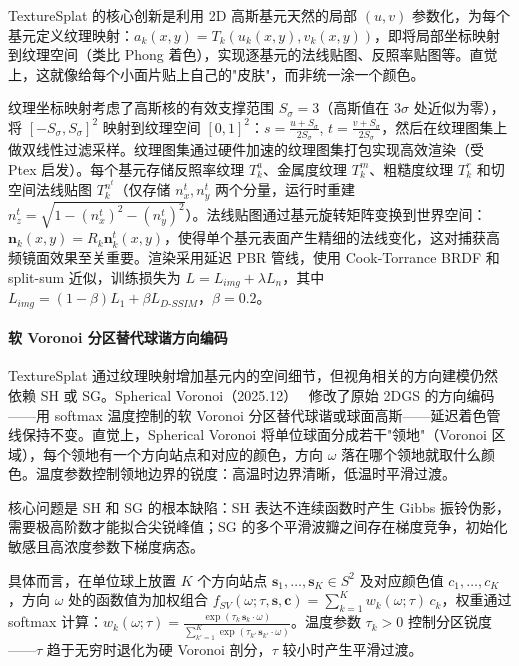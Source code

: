 TextureSplat 的核心创新是利用 2D 高斯基元天然的局部 $(u,v)$ 参数化，为每个基元定义纹理映射：$a_k(x,y) = T_k(u_k(x,y), v_k(x,y))$，即将局部坐标映射到纹理空间（类比 Phong 着色），实现逐基元的法线贴图、反照率贴图等。直觉上，这就像给每个小面片贴上自己的"皮肤"，而非统一涂一个颜色。

纹理坐标映射考虑了高斯核的有效支撑范围 $S_\sigma = 3$（高斯值在 $3\sigma$ 处近似为零），将 $[-S_\sigma, S_\sigma]^2$ 映射到纹理空间 $[0,1]^2$：$s = \frac{u + S_\sigma}{2S_\sigma}$, $t = \frac{v + S_\sigma}{2S_\sigma}$，然后在纹理图集上做双线性过滤采样。纹理图集通过硬件加速的纹理图集打包实现高效渲染（受 Ptex 启发）。每个基元存储反照率纹理 $T_k^a$、金属度纹理 $T_k^m$、粗糙度纹理 $T_k^r$ 和切空间法线贴图 $T_k^{n^t}$（仅存储 $n_x^t, n_y^t$ 两个分量，运行时重建 $n_z^t = \sqrt{1 - (n_x^t)^2 - (n_y^t)^2}$）。法线贴图通过基元旋转矩阵变换到世界空间：$\mathbf{n}_k(x,y) = R_k \mathbf{n}^t_k(x,y)$，使得单个基元表面产生精细的法线变化，这对捕获高频镜面效果至关重要。渲染采用延迟 PBR 管线，使用 Cook-Torrance BRDF 和 split-sum 近似，训练损失为 $L = L_{img} + \lambda L_n$，其中 $L_{img} = (1-\beta) L_1 + \beta L_{D\text{-}SSIM}$，$\beta = 0.2$。

\paragraph{软 Voronoi 分区替代球谐方向编码}

TextureSplat 通过纹理映射增加基元内的空间细节，但视角相关的方向建模仍然依赖 SH 或 SG。Spherical Voronoi（2025.12）~\cite{2512_14180} 修改了原始 2DGS 的方向编码——用 softmax 温度控制的软 Voronoi 分区替代球谐或球面高斯——延迟着色管线保持不变。直觉上，Spherical Voronoi 将单位球面分成若干"领地"（Voronoi 区域），每个领地有一个方向站点和对应的颜色，方向 $\omega$ 落在哪个领地就取什么颜色。温度参数控制领地边界的锐度：高温时边界清晰，低温时平滑过渡。

核心问题是 SH 和 SG 的根本缺陷：SH 表达不连续函数时产生 Gibbs 振铃伪影，需要极高阶数才能拟合尖锐峰值；SG 的多个平滑波瓣之间存在梯度竞争，初始化敏感且高浓度参数下梯度病态。

具体而言，在单位球上放置 $K$ 个方向站点 $\mathbf{s}_1, \ldots, \mathbf{s}_K \in S^2$ 及对应颜色值 $c_1, \ldots, c_K$，方向 $\omega$ 处的函数值为加权组合 $f_{SV}(\omega; \tau, \mathbf{s}, \mathbf{c}) = \sum_{k=1}^K w_k(\omega; \tau) \, c_k$，权重通过 softmax 计算：$w_k(\omega; \tau) = \frac{\exp(\tau_k \, \mathbf{s}_k \cdot \omega)}{\sum_{k'=1}^K \exp(\tau_{k'} \, \mathbf{s}_{k'} \cdot \omega)}$。温度参数 $\tau_k > 0$ 控制分区锐度——$\tau$ 趋于无穷时退化为硬 Voronoi 剖分，$\tau$ 较小时产生平滑过渡。

